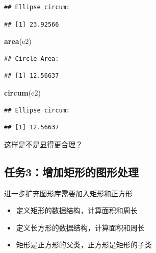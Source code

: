 \documentclass[]{book}
\newenvironment{Shaded}{\begin{snugshade}}{\end{snugshade}}
\newcommand{\KeywordTok}[1]{\textcolor[rgb]{0.13,0.29,0.53}{\textbf{#1}}}
\newcommand{\NormalTok}[1]{#1}
\begin{document}
\begin{verbatim}
## Ellipse circum:
\end{verbatim}

\begin{verbatim}
## [1] 23.92566
\end{verbatim}

\begin{Shaded}
\begin{Highlighting}[]
\KeywordTok{area}\NormalTok{(e2)}
\end{Highlighting}
\end{Shaded}

\begin{verbatim}
## Circle Area:
\end{verbatim}

\begin{verbatim}
## [1] 12.56637
\end{verbatim}

\begin{Shaded}
\begin{Highlighting}[]
\KeywordTok{circum}\NormalTok{(e2)}
\end{Highlighting}
\end{Shaded}

\begin{verbatim}
## Ellipse circum:
\end{verbatim}

\begin{verbatim}
## [1] 12.56637
\end{verbatim}

这样是不是显得更合理？

\subsection{任务3：增加矩形的图形处理}\label{3}

进一步扩充图形库需要加入矩形和正方形

\begin{itemize}
\item
  定义矩形的数据结构，计算面积和周长
\item
  定义长方形的数据结构，计算面积和周长
\item
  矩形是正方形的父类，正方形是矩形的子类
\end{itemize}
\end{document}

